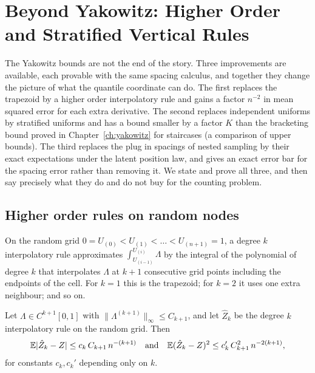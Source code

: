 \chapter{Beyond Yakowitz: Higher Order and Stratified Vertical Rules}
\label{ch:beyond}

The Yakowitz bounds are not the end of the story. Three improvements are available, each provable with the same spacing calculus, and together they change the picture of what the quantile coordinate can do. The first replaces the trapezoid by a higher order interpolatory rule and gains a factor $n^{-2}$ in mean squared error for each extra derivative. The second replaces independent uniforms by stratified uniforms and has a bound smaller by a factor $K$ than the bracketing bound proved in Chapter~\ref{ch:yakowitz} for staircases (a comparison of upper bounds). The third replaces the plug in spacings of nested sampling by their exact expectations under the latent position law, and gives an exact error bar for the spacing error rather than removing it. We state and prove all three, and then say precisely what they do and do not buy for the counting problem.

\section{Higher order rules on random nodes}

On the random grid $0 = U_{(0)} < U_{(1)} < \dots < U_{(n+1)} = 1$, a degree $k$ interpolatory rule approximates $\int_{U_{(i-1)}}^{U_{(i)}} \Lambda$ by the integral of the polynomial of degree $k$ that interpolates $\Lambda$ at $k + 1$ consecutive grid points including the endpoints of the cell. For $k = 1$ this is the trapezoid; for $k = 2$ it uses one extra neighbour; and so on.

\begin{theorem}
\label{thm:interp}
Let $\Lambda \in C^{k+1}[0, 1]$ with $\|\Lambda^{(k+1)}\|_\infty \le C_{k+1}$, and let $\hat Z_k$ be the degree $k$ interpolatory rule on the random grid. Then
\[
\mathbb{E} | \hat Z_k - Z | \le c_k \, C_{k+1} \, n^{-(k+1)} \quad \text{and} \quad \mathbb{E} ( \hat Z_k - Z )^2 \le c_k' \, C_{k+1}^2 \, n^{-2(k+1)} ,
\]
for constants $c_k, c_k'$ depending only on $k$.
\end{theorem}

